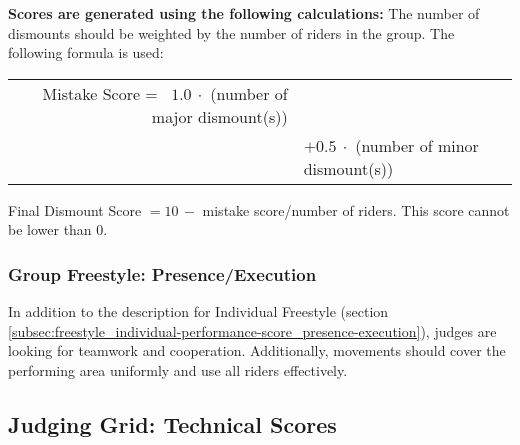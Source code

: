 \textbf{Scores are generated using the following calculations:}
The number of dismounts should be weighted by the number of riders in the group.
The following formula is used:

\begin{tabular}{r l}
Mistake Score = \ $1.0\ \cdot$ (number of major dismount(s)) \\
 & $+ 0.5\ \cdot$ (number of minor dismount(s)) \\
\end{tabular}

Final Dismount Score $= 10 \, -$ mistake score/number of riders.
This score cannot be lower than 0.

\subsubsection{Group Freestyle: Presence/Execution}

In addition to the description for Individual Freestyle (section \ref{subsec:freestyle_individual-performance-score_presence-execution}), judges are looking for teamwork and cooperation.
Additionally, movements should cover the performing area uniformly and use all riders effectively.

\newpage
\subsection{Judging Grid: Technical Scores}

